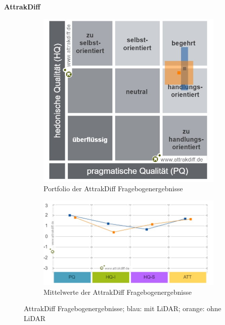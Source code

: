 \documentclass[titlepage, a4paper, 11pt]{scrartcl}
\begin{document}
  \textbf{AttrakDiff}\\

  \begin{figure}
  \centering
  \begin{subfigure}{.5\textwidth}
    \centering
    \includegraphics[width=.9\linewidth]{AttrakDiff_Portfolio}
    \caption{Portfolio der AttrakDiff Fragebogenergebnisse}
    \label{AttrakDiff_P}
  \end{subfigure}%
  \begin{subfigure}{.5\textwidth}
    \centering
    \includegraphics[width=.9\linewidth]{AttrakDiff_Mittelwerte}
    \caption{Mittelwerte der AttrakDiff Fragebogenergebnisse}
    \label{AttrakDiff_M}
  \end{subfigure}
  \caption{AttrakDiff Fragebogenergebnisse; blau: mit LiDAR; orange: ohne LiDAR}
  \label{AttrakDiff}
  \end{figure}
\end{document}
